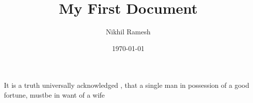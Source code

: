 \documentclass[a4paper,12pt]{article}
\begin{document}
\title{My First Document}
\author{Nikhil Ramesh}
\date{\today}
\maketitle

It is a truth universally acknowledged%
, that a single man in possession of a good fortune, mustbe in want of a wife
\end{document}
